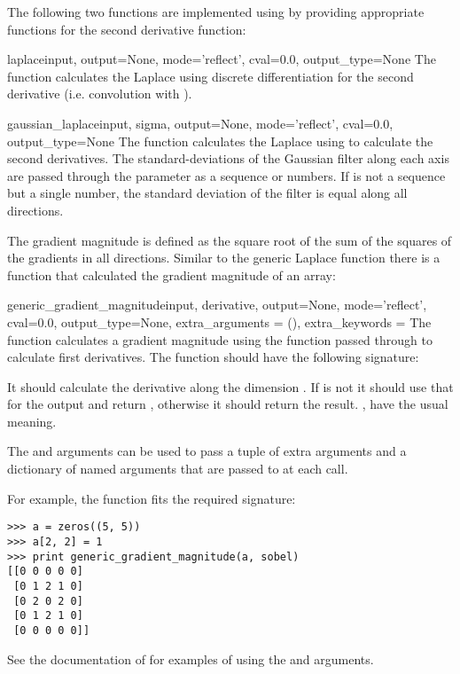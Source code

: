 The following two functions are implemented using 
 by providing appropriate functions for the 
second derivative function:

\begin{funcdesc}{laplace}{input, output=None, mode='reflect', 
  cval=0.0, output_type=None} 
  The function  calculates 
  the Laplace using discrete differentiation for the second derivative 
  (i.e. convolution with \constant{[1, -2, 1]}).
\end{funcdesc}

\begin{funcdesc}{gaussian_laplace}{input, sigma, output=None, 
  mode='reflect', cval=0.0, output_type=None} The function 
   calculates the Laplace using 
   to calculate the
  second derivatives. The standard-deviations of the Gaussian filter along 
  each axis are passed through the parameter  as a sequence or 
  numbers.  If  is not a sequence but a single number, the 
  standard deviation of the filter is equal along all directions.
  \end{funcdesc}

The gradient magnitude is defined as the square root of the sum of the 
squares of the gradients in all directions. Similar to the generic Laplace 
function there is a  function that 
calculated the gradient magnitude of an array:

\begin{funcdesc}{generic_gradient_magnitude}{input, derivative,
  output=None, mode='reflect', cval=0.0, output_type=None, 
  extra_arguments = (), extra_keywords = {}} The 
  function  calculates a gradient 
  magnitude using the function passed through  to calculate 
  first derivatives. The function  should have the 
  following signature:

  
  It should calculate the derivative along the dimension . If
   is not  it should use that for the output and
  return , otherwise it should return the result. 
  ,  have the usual meaning.
  
  The  and  arguments can be used 
  to pass a tuple of extra arguments and a dictionary of named 
  arguments that are passed to  at each call.

  For example, the  function fits the required signature:
\begin{verbatim}
>>> a = zeros((5, 5))
>>> a[2, 2] = 1
>>> print generic_gradient_magnitude(a, sobel)
[[0 0 0 0 0]
 [0 1 2 1 0]
 [0 2 0 2 0]
 [0 1 2 1 0]
 [0 0 0 0 0]]
\end{verbatim}
See the documentation of  for examples of using the  and  arguments.
\end{funcdesc}

